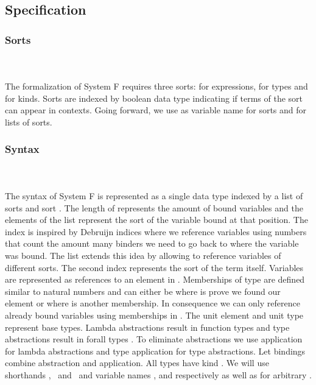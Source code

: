 \subsection{Specification}
\subsubsection{Sorts}\hfill\\\\
The formalization of System F requires three sorts:  for expressions,  for types and  for kinds. 
\FSort
Sorts are indexed by boolean data type  indicating if terms of the sort can appear in contexts.
Going forward, we use  as variable name for sorts and  for lists of sorts.

\subsubsection{Syntax}\hfill\\\\
The syntax of System F is represented as a single data type  indexed by a list of sorts  and sort . 
The length of  represents the amount of bound variables and the elements  of the list represent the sort of the variable bound at that position. 
The index  is inspired by Debruijn indices where we reference variables using numbers that count the amount many binders we need to go back to where the variable was bound.
The list  extends this idea by allowing to reference variables of different sorts.
The second index  represents the sort of the term itself.
\FTerm
Variables \  are represented as references    to an element in .
Memberships of type    are defined similar to natural numbers and can either be  where  is prove we found our element or   where  is another membership. 
In consequence we can only reference already bound variables using memberships in .
The unit element  and unit type  represent base types. Lambda abstractions   result in function types    and type abstractions   result in forall types  . 
To eliminate abstractions we use application    for lambda abstractions and type application    for type abstractions. 
Let bindings     combine abstraction and application. All types  have kind .
We will use shorthands \FVar, \FExpr\ and \FType\ and variable names ,  and  respectively as well as  for arbitrary   .

